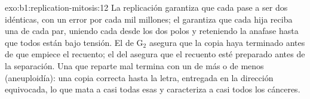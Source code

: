 \begin{solution}{exo:b1:replication-mitosis:12}
La replicación garantiza que cada  pase a ser dos 
idénticas, con un error por cada mil millones; el  garantiza que cada
hija reciba una de cada par, uniendo cada  desde los dos polos y
reteniendo la anafase hasta que todos están bajo tensión. El  de G$_2$ asegura que la copia haya terminado antes de que empiece el
recuento; el  del  asegura que el recuento esté
preparado antes de la separación. Una  que reparte mal termina con un
 de más o de menos (aneuploidía): una copia correcta hasta la
letra, entregada en la dirección equivocada, lo que mata a casi todas esas
 y caracteriza a casi todos los cánceres.
\end{solution}

